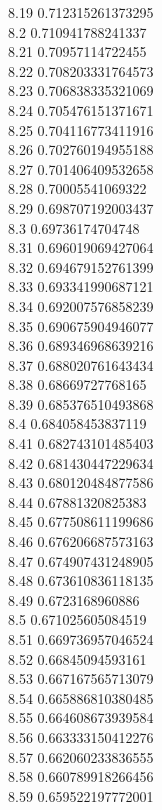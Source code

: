 {8.19	0.712315261373295\\
8.2	0.710941788241337\\
8.21	0.70957114722455\\
8.22	0.708203331764573\\
8.23	0.706838335321069\\
8.24	0.705476151371671\\
8.25	0.704116773411916\\
8.26	0.702760194955188\\
8.27	0.701406409532658\\
8.28	0.70005541069322\\
8.29	0.698707192003437\\
8.3	0.69736174704748\\
8.31	0.696019069427064\\
8.32	0.694679152761399\\
8.33	0.693341990687121\\
8.34	0.692007576858239\\
8.35	0.690675904946077\\
8.36	0.689346968639216\\
8.37	0.688020761643434\\
8.38	0.68669727768165\\
8.39	0.685376510493868\\
8.4	0.684058453837119\\
8.41	0.682743101485403\\
8.42	0.681430447229634\\
8.43	0.680120484877586\\
8.44	0.67881320825383\\
8.45	0.677508611199686\\
8.46	0.676206687573163\\
8.47	0.674907431248905\\
8.48	0.673610836118135\\
8.49	0.6723168960886\\
8.5	0.671025605084519\\
8.51	0.669736957046524\\
8.52	0.66845094593161\\
8.53	0.667167565713079\\
8.54	0.665886810380485\\
8.55	0.664608673939584\\
8.56	0.663333150412276\\
8.57	0.662060233836555\\
8.58	0.660789918266456\\
8.59	0.659522197772001\\
}

